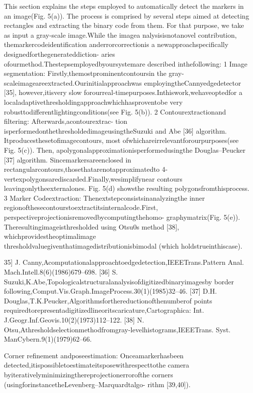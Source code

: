 \documentclass[a4paper]{report}
\begin{document}
This section explains the steps employed to automatically
detect the markers in an image(Fig. 5(a)). The process is
comprised by several steps aimed at detecting rectangles and
extracting the binary code from them. For that purpose, we take as
input a gray-scale image.While the imagea nalysisisnotanovel
contribution, themarkercodeidentification anderrorcorrectionis
a newapproachspecifically designedforthegenerateddiction-
aries ofourmethod.Thestepsemployedbyoursystemare
described inthefollowing:
1 Image segmentation: Firstly,themostprominentcontoursin
the gray-scaleimageareextracted.Ourinitialapproachwas
employingtheCannyedgedetector [35], however,itisvery
slow forourreal-timepurposes.Inthiswork,wehaveoptedfor
a localadaptivethresholdingapproachwhichhasproventobe
very robusttodifferentlightingconditions(see Fig. 5(b)).
2 Contourextractionand filtering: Afterwards,acontourextrac-
tion isperformedonthethresholdedimageusingtheSuzuki
and Abe [36] algorithm. Itproducesthesetofimagecontours,
most ofwhichareirrelevantforourpurposes(see Fig. 5(c)).
Then, apolygonalapproximationisperformedusingthe
Douglas–Peucker [37] algorithm. Sincemarkersareenclosed
in rectangularcontours,thosethatarenotapproximatedto
4-vertexpolygonsarediscarded.Finally,wesimplifynear
contours leavingonlytheexternalones. Fig. 5(d) showsthe
resulting polygonsfromthisprocess.
3 Marker Codeextraction: Thenextstepconsistsinanalyzingthe
inner regionofthesecontourstoextractitsinternalcode.First,
perspectiveprojectionisremovedbycomputingthehomo-
graphymatrix(Fig. 5(e)). Theresultingimageisthresholded
using Otsu0s method [38], whichprovidestheoptimalimage
thresholdvaluegiventhatimagedistributionisbimodal
(which holdstrueinthiscase).

35] J. Canny,Acomputationalapproachtoedgedetection,IEEETrans.Pattern
Anal. Mach.Intell.8(6)(1986)679–698.
[36] S. Suzuki,K.Abe,Topologicalstructuralanalysisofdigitizedbinaryimagesby
border following,Comput.Vis.Graph.ImageProcess.30(1)(1985)32–46.
[37] D.H. Douglas,T.K.Peucker,Algorithmsforthereductionofthenumberof
points requiredtorepresentadigitizedlineoritscaricature,Cartographica:
Int. J.Geogr.Inf.Geovis.10(2)(1973)112–122.
[38] N. Otsu,Athresholdselectionmethodfromgray-levelhistograms,IEEETrans.
Syst. ManCybern.9(1)(1979)62–66.

Corner refinement andposeestimation: Onceamarkerhasbeen
detected,itispossibletoestimateitsposewithrespecttothe
camera byiterativelyminimizingthereprojectionerrorofthe
corners (usingforinstancetheLevenberg–Marquardtalgo-
rithm [39,40]). 
\end{document}
